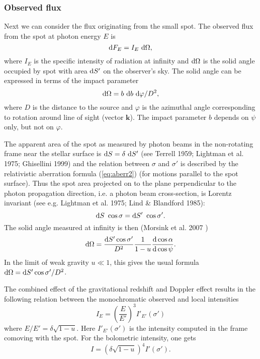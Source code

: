 \documentclass{wihuri}
\def\be{\begin{equation}}
\def\ee{\end{equation}}
\def\d{{\rm d}}
\def\Dop{\delta}
\newcommand{\bmath}[1]{\boldsymbol{#1}}
\begin{document}
\subsubsection{Observed flux}

Next we can consider the flux originating from the small spot. The observed flux from the spot at photon energy $E$ is
\be
\label{eq:dF_E2}
  \d F_E=I_E\ \d\Omega,
\ee
where $I_E$ is the specific   intensity of radiation
at infinity and $\d\Omega$ is
the solid angle occupied by spot with area $\d S'$ on the observer's sky.
The solid angle can be expressed in terms of the impact parameter
\be
\d\Omega=b\ \d b\ \d\varphi/D^2,
\ee
where $D$ is the distance to the source and $\varphi$ is the azimuthal
angle corresponding to rotation around line of sight (vector $\bmath{k}$).
The impact parameter $b$ depends on $\psi$ only, but not on $\varphi$.

The apparent area of the spot as measured by photon beams
in the non-rotating frame near the stellar surface is $\d S=\Dop\ \d S'$
(see Terrell 1959; Lightman et al. 1975; Ghisellini 1999) 
and the relation between $\sigma$ and $\sigma'$ is described 
by the relativistic aberration formula (\ref{eq:aberr2}) (for motions parallel to the 
spot surface). Thus the spot area projected on to the plane perpendicular 
to the photon propagation direction, i.e. a photon beam cross-section,
is Lorentz invariant (see e.g.  Lightman et al. 1975; 
Lind \& Blandford 1985): 
\be \label{eq:Salpha2}
\d S\ \cos\sigma = \d S'\ \cos\sigma' . 
\ee
The solid angle measured at infinity is then (Morsink et al. 2007 \cite{morsink})
\be\label{eq:omega2}
 \d\Omega=\frac{\d S' \cos \sigma'}{D^2} \frac{1}{1-u} \frac{\d\cos\alpha}{\d\cos\psi}.
\ee
In the limit of weak gravity $u\ll 1$, this gives
the usual formula $\d\Omega=\d S' \cos \sigma'/D^2$. 

The combined effect of the gravitational redshift and Doppler effect
results in the following  relation between the monochromatic
observed and local intensities \cite{mtw}%
\be
I_{E} = \left (\frac{E}{E'}\right )^3 I'_{E '} (\sigma')
\ee
where $E/E'=\Dop \sqrt{1-u}$.
Here $I'_{E'}(\sigma')$ is the intensity computed in the frame comoving with
the spot.
For the bolometric intensity, one gets
\be
I= \left (\Dop \sqrt{1-u} \right )^4 I'(\sigma') .
\ee
\end{document}
